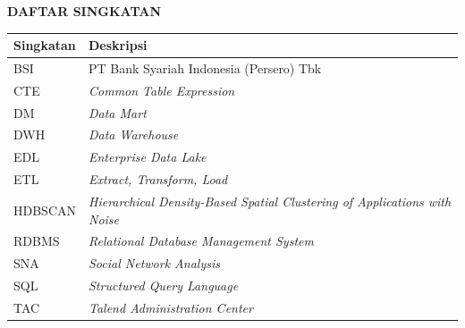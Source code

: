 \cleardoublepage
\vspace{2cm}
\begin{center}
{\fontsize{14}{16.8}\selectfont\textbf{DAFTAR SINGKATAN}}\\[1em]
\end{center}
\label{chap:singkatan}
\vspace{2em}
\begin{longtable}{@{} l >{\raggedright\arraybackslash}p{9.5cm} @{}}
\textbf{Singkatan} & \textbf{Deskripsi} \\
\hline
BSI & PT Bank Syariah Indonesia (Persero) Tbk \\
CTE & \textit{Common Table Expression} \\
DM & \textit{Data Mart} \\
DWH & \textit{Data Warehouse} \\
EDL & \textit{Enterprise Data Lake} \\
ETL & \textit{Extract, Transform, Load} \\
HDBSCAN & \textit{Hierarchical Density-Based Spatial Clustering of Applications with Noise} \\
RDBMS & \textit{Relational Database Management System} \\
SNA & \textit{Social Network Analysis} \\
SQL & \textit{Structured Query Language} \\
TAC & \textit{Talend Administration Center} \\
\end{longtable}
